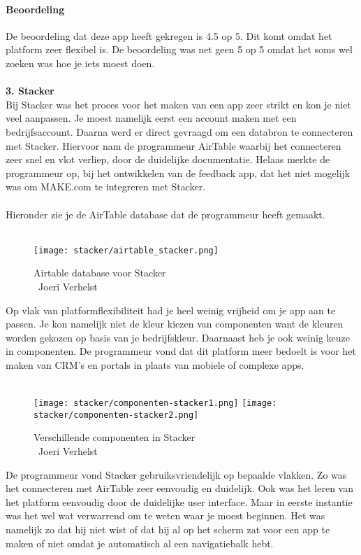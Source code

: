 \paragraph*{Beoordeling}
De beoordeling dat deze app heeft gekregen is 4.5 op 5. Dit komt omdat het platform zeer flexibel is. 
De beoordeling was net geen 5 op 5 omdat het soms wel zoeken was hoe je iets moest doen.
\\
\\
\textbf{3. Stacker}
\\
Bij Stacker was het proces voor het maken van een app zeer strikt en kon je niet veel aanpassen. Je moest namelijk eerst een account maken met een bedrijfsaccount.
Daarna werd er direct gevraagd om een databron te connecteren met Stacker. Hiervoor nam de programmeur AirTable waarbij het connecteren zeer snel en vlot verliep, door de duidelijke documentatie.
Helaas merkte de programmeur op, bij het ontwikkelen van de feedback app, dat het niet mogelijk was om MAKE.com te integreren met Stacker.
\\
\\
Hieronder zie je de AirTable database dat de programmeur heeft gemaakt.
\\
\\
\begin{figure}[H]
    \texttt{[image: stacker/airtable\_stacker.png]}
    \caption[Airtable database voor Stacker]{Airtable database voor Stacker\\\textcopyright\ Joeri Verhelst}
    \label{fig:airtable-stacker}
\end{figure}
Op vlak van platformflexibiliteit had je heel weinig vrijheid om je app aan te passen. Je kon namelijk niet de kleur kiezen van componenten want de kleuren worden gekozen
op basis van je bedrijfskleur. Daarnaast heb je ook weinig keuze in componenten. De programmeur vond dat dit platform meer bedoelt is voor het maken van CRM's en portals in plaats van 
mobiele of complexe apps.
\\
\\

\begin{figure}[H]
    \texttt{[image: stacker/componenten-stacker1.png]}
    \texttt{[image: stacker/componenten-stacker2.png]}
    \caption[Verschillende componenten in Stacker]{Verschillende componenten in Stacker\\\textcopyright\ Joeri Verhelst}
    \label{fig:componenten-stacker}
\end{figure}
De programmeur vond Stacker gebruiksvriendelijk op bepaalde vlakken. Zo was het connecteren met AirTable zeer eenvoudig en duidelijk.
Ook was het leren van het platform eenvoudig door de duidelijke user interface. Maar in eerste instantie was het wel wat verwarrend om te weten waar je moest beginnen.
Het was namelijk zo dat hij niet wist of dat hij al op het scherm zat voor een app te maken of niet omdat je automatisch al een navigatiebalk hebt.
\\
\\
